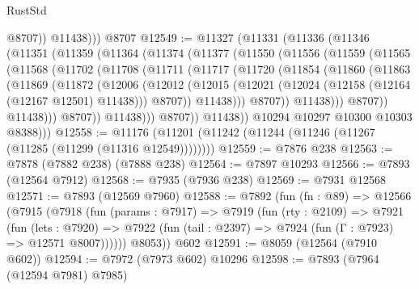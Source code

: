 \begin{lexlean}{RustStd}
\begin{coremodule}
{\begin{coremodule}
{{{{{{{{{{{{{{{{{{{{{{{{{{{{{{{{{{{{{{{{{{{{{{{{{{              @8707))
          @11438)))
    @8707
@12549 := @11327
    (@11331
      (@11336
        (@11346
          (@11351
            (@11359
              (@11364
                (@11374
                  (@11377
                    (@11550
                      (@11556
                        (@11559
                          (@11565
                            (@11568
                              (@11702
                                (@11708
                                  (@11711
                                    (@11717
                                      (@11720
                                        (@11854
                                          (@11860
                                            (@11863
                                              (@11869
                                                (@11872
                                                  (@12006
                                                    (@12012
                                                      (@12015
                                                        (@12021
                                                          (@12024
                                                            (@12158
                                                              (@12164 (@12167 @12501) @11438)))
                                                          @8707))
                                                      @11438)))
                                                @8707))
                                            @11438)))
                                      @8707))
                                  @11438)))
                            @8707))
                        @11438)))
                  @8707))
              @11438))
          @10294
          @10297
          @10300
          @10303
          @8388)))
@12558 := @11176 (@11201 (@11242 (@11244 (@11246 (@11267 (@11285 (@11299 (@11316 @12549))))))))
@12559 := @7876 @238
@12563 := @7878 (@7882 @238) (@7888 @238)
@12564 := @7897 @10293
@12566 := @7893 (@12564 @7912)
@12568 := @7935 (@7936 @238)
@12569 := @7931 @12568
@12571 := @7893 (@12569 @7960)
@12588 := @7892
    (fun (fn : @89) =>
    @12566
      (@7915
        (@7918
          (fun (params : @7917) =>
          @7919
            (fun (rty : @2109) =>
            @7921
              (fun (lets : @7920) =>
              @7922 (fun (tail : @2397) => @7924 (fun (Γ : @7923) => @12571 @8007))))))
        @8053))
    @602
@12591 := @8059 (@12564 (@7910 @602))
@12594 := @7972 (@7973 @602) @10296
@12598 := @7893 (@7964 (@12594 @7981) @7985)
}}}}}}}}}}}}}}}}}}}}}}}}}}}}}}}}}}}}}}}}}}}}}}}}}}
\end{coremodule}}
\end{coremodule}
\end{lexlean}
